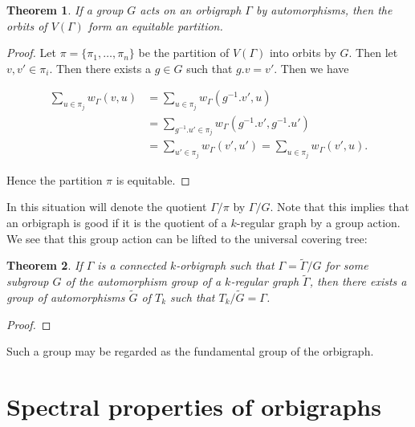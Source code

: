 \documentclass[12pt]{article}
\theoremstyle{plain}
\newtheorem{theorem}{Theorem}
\theoremstyle{definition}
\theoremstyle{remark}
\begin{document}
    \begin{theorem}\label{thm:GroupQuotient}
      If a group $G$ acts on an orbigraph $\Gamma$ by automorphisms, then the orbits of $V(\Gamma)$ form an equitable partition.
    \end{theorem}
    \begin{proof}
      Let $\pi = \{ \pi_1, \ldots, \pi_n \}$ be the partition of $V(\Gamma)$ into orbits by $G$. Then let $v, v' \in \pi_i$. Then there exists a $g \in G$ such that $g . v = v'$. Then we have
      
      \begin{align*}
        \sum_{u \in \pi_j} w_\Gamma(v, u) &= \sum_{u \in \pi_j} w_\Gamma(g^{-1}.v', u) \\
        &= \sum_{g^{-1}.u' \in \pi_j} w_\Gamma(g^{-1}.v', g^{-1}.u') \\
        &= \sum_{u' \in \pi_j} w_\Gamma(v', u') = \sum_{u \in \pi_j} w_\Gamma(v', u).
      \end{align*}

      Hence the partition $\pi$ is equitable.
    \end{proof}

    In this situation will denote the quotient $\Gamma / \pi$ by $\Gamma / G$. Note that this implies that an orbigraph is good if it is the quotient of a $k$-regular graph by a group action. We see that this group action can be lifted to the universal covering tree:

    \begin{theorem}\label{thm:GoodFundamentalGroup}
      If $\Gamma$ is a connected $k$-orbigraph such that $\Gamma = \widetilde{\Gamma}/G$ for some subgroup $G$ of the automorphism group of a $k$-regular graph $\widetilde{\Gamma}$, then there exists a group of automorphisms $\widetilde{G}$ of $T_k$ such that $T_k / \widetilde{G} = \Gamma$.
    \end{theorem}
    \begin{proof}
      
    \end{proof}

    Such a group may be regarded as the fundamental group of the orbigraph.

    

\section{Spectral properties of orbigraphs}
\end{document}
